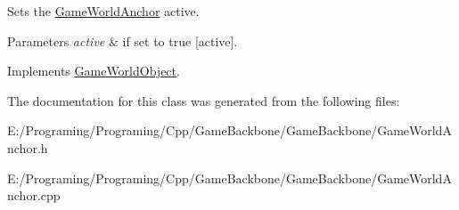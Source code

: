 Sets the \hyperlink{class_game_world_anchor}{Game\+World\+Anchor} active. 


\begin{DoxyParams}{Parameters}
{\em active} & if set to {\ttfamily true} \mbox{[}active\mbox{]}.\\
\hline
\end{DoxyParams}


Implements \hyperlink{class_game_world_object_a79d89ff68b9334b454300cf855719b77}{Game\+World\+Object}.



The documentation for this class was generated from the following files\+:\begin{DoxyCompactItemize}
\item 
E\+:/\+Programing/\+Programing/\+Cpp/\+Game\+Backbone/\+Game\+Backbone/Game\+World\+Anchor.\+h\item 
E\+:/\+Programing/\+Programing/\+Cpp/\+Game\+Backbone/\+Game\+Backbone/Game\+World\+Anchor.\+cpp\end{DoxyCompactItemize}

